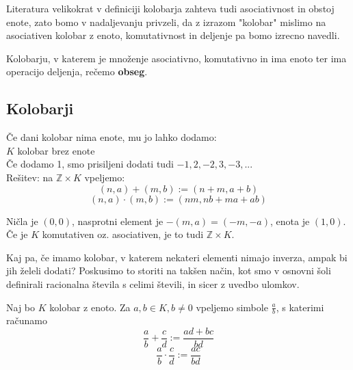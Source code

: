 \documentclass[11pt, a4paper]{article}
\begin{document}
    Literatura velikokrat v definiciji kolobarja zahteva tudi asociativnost in obstoj enote, zato bomo v nadaljevanju privzeli, da z izrazom "kolobar" mislimo na asociativen kolobar z enoto, komutativnost in deljenje pa bomo izrecno navedli.
    
    \begin{definition}[Obseg]
        Kolobarju, v katerem je množenje asociativno, komutativno in ima enoto ter ima operacijo deljenja, rečemo \textbf{obseg}.
    \end{definition}

    \subsection{Kolobarji}

    \begin{example}
        Če dani kolobar nima enote, mu jo lahko dodamo: \\
        \(K\) kolobar brez enote \\
        Če dodamo 1, smo prisiljeni dodati tudi \(-1,2,-2,3,-3,...\) \\
        Rešitev: na \(\mathbb{Z} \times K \) vpeljemo:
        \[
            (n,a)+(m,b) := (n+m,a+b)
        \]
        \[
            (n,a) \cdot (m,b) := (nm, nb + ma + ab)
        \]

        Ničla je \((0,0)\), nasprotni element je \(-(m,a) = (-m,-a)\), enota je \((1,0)\). Če je \(K\) komutativen oz. asociativen, je to tudi \(\mathbb{Z} \times K\).
    \end{example}

    Kaj pa, če imamo kolobar, v katerem nekateri elementi nimajo inverza, ampak bi jih želeli dodati? Poskusimo to storiti na takšen način, kot smo v osnovni šoli definirali racionalna števila s celimi števili, in sicer z uvedbo ulomkov. 

    \par
    Naj bo \(K\) kolobar z enoto. Za \(a,b \in K, b \neq 0\) vpeljemo simbole \(\frac{a}{b}\), s katerimi računamo 
    \[\frac{a}{b} + \frac{c}{d} := \frac{ad + bc}{bd}\] 
    \[\frac{a}{b} \cdot \frac{c}{d} := \frac{ac}{bd}\]
\end{document}
